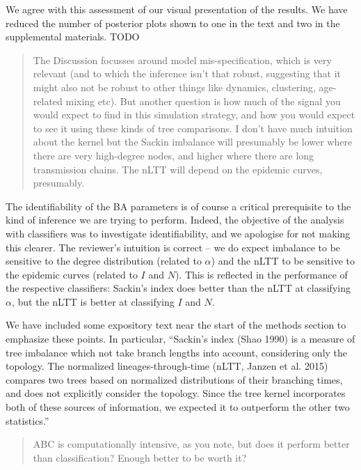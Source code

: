 \documentclass[12pt]{letter}
\begin{document}
\begin{letter}{ }
We agree with this assessment of our visual presentation of the results. We
have reduced the number of posterior plots shown to one in the text and two in
the supplemental materials. TODO


\begin{quote}
  \itshape

  The Discussion focusses around model mis-specification, which is very
  relevant (and to which the inference isn't that robust, suggesting that it
  might also not be robust to other things like dynamics, clustering,
  age-related mixing etc). But another question is how much of the signal you
  would expect to find in this simulation strategy, and how you would expect to
  see it using these kinds of tree comparisons. I don't have much intuition
  about the kernel but the Sackin imbalance will presumably be lower where
  there are very high-degree nodes, and higher where there are long
  transmission chains. The nLTT will depend on the epidemic curves, presumably.
\end{quote}

The identifiability of the BA parameters is of course a critical prerequisite
to the kind of inference we are trying to perform. Indeed, the objective of the 
analysis with classifiers was to investigate identifiability, and we apologise
for not making this clearer. The reviewer's intuition is correct -- we do
expect imbalance to be sensitive to the degree distribution (related to
$\alpha$) and the nLTT to be sensitive to the epidemic curves (related to $I$
and $N$). This is reflected in the performance of the respective classifiers:
Sackin's index does better than the nLTT at classifying $\alpha$, but the nLTT
is better at classifying $I$ and $N$.

We have included some expository text near the start of the methods section to
emphasize these points. In particular, ``Sackin's index (Shao 1990)
is a measure of tree imbalance which not take branch lengths into account,
considering only the topology. The normalized lineages-through-time (nLTT,
Janzen et al. 2015) compares two trees based on normalized distributions of
their branching times, and does not explicitly consider the topology. Since the
tree kernel incorporates both of these sources of information, we expected it
to outperform the other two statistics.''

\begin{quote}
  \itshape

  ABC is computationally intensive, as you note, but does it perform better
  than classification? Enough better to be worth it?
\end{quote}


\end{letter}
\end{document}
